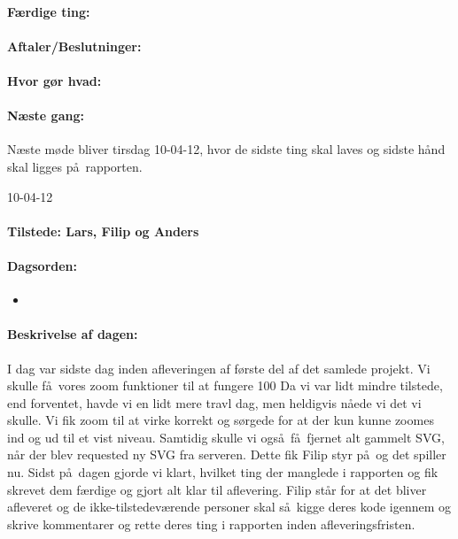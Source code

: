 \documentclass[a4paper,10pt,titlepage]{article}
\begin{document}
		\paragraph{F\ae rdige ting:}
		
		\paragraph{Aftaler/Beslutninger:}
		
		\paragraph{Hvor g\o r hvad:}
		
		\paragraph{N\ae ste gang:}
		N\ae ste m\o de bliver tirsdag 10-04-12, hvor de sidste ting skal laves og sidste h\aa nd skal ligges p\aa \ rapporten. \mbox{}\\ 
		
		\begin{center}
		10-04-12
		\end{center}
		
		\paragraph{Tilstede: Lars, Filip og Anders}
		\paragraph{Dagsorden:}
		\begin{itemize}
					\item 
					 
		\end{itemize}
		
		\paragraph{Beskrivelse af dagen:}
		I dag var sidste dag inden afleveringen af f\o rste del af det samlede projekt. Vi skulle f\aa \ vores zoom funktioner til at fungere 100%
Da vi var lidt mindre tilstede, end forventet, havde vi en lidt mere travl dag, men heldigvis n\aa ede vi det vi skulle. Vi fik zoom til at virke korrekt og s\o rgede for at der kun kunne zoomes ind og ud til et vist niveau. Samtidig skulle vi ogs\aa \ f\aa \ fjernet alt gammelt SVG, n\aa r der blev requested ny SVG fra serveren. Dette fik Filip styr p\aa \ og det spiller nu. Sidst p\aa \ dagen gjorde vi klart, hvilket ting der manglede i rapporten og fik skrevet dem f\ae rdige og gjort alt klar til aflevering. Filip st\aa r for at det bliver afleveret og de ikke-tilstedev\ae rende personer skal s\aa \ kigge deres kode igennem og skrive kommentarer og rette deres ting i rapporten inden afleveringsfristen.
\end{document}
